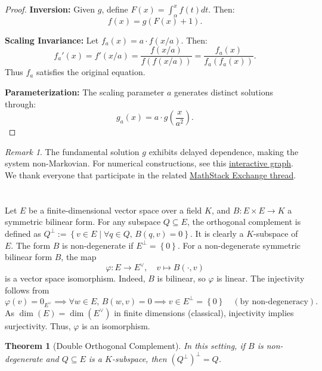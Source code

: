\documentclass[11pt, a4paper, oneside]{article}
\newtheorem{theorem}{Theorem}
\theoremstyle{remark}
\newtheorem*{remark}{Remark}
\theoremstyle{lemma}
\begin{document}
\begin{proof}
\textbf{Inversion:} Given \( g \), define \( F(x) = \int_{\alpha}^x f(t)dt \). Then:
\[
f(x) = g(F(x) + 1).
\]

\textbf{Scaling Invariance:} Let \( f_a(x) = a \cdot f(x/a) \). Then:
\[
f_a'(x) = f'(x/a) = \frac{f(x/a)}{f(f(x/a))} = \frac{f_a(x)}{f_a(f_a(x))}.
\]
Thus \( f_a \) satisfies the original equation.

\textbf{Parameterization:} The scaling parameter \( a \) generates distinct solutions through:
\[
g_a(x) = a \cdot g\left(\frac{x}{a^2}\right).
\]
\end{proof}
\begin{remark}
The fundamental solution \( g \) exhibits delayed dependence, making the system non-Markovian. For numerical constructions, see this \href{https://www.desmos.com/calculator/hfizeaaf9k}{interactive graph}. We thank everyone that participate in the related \href{https://math.stackexchange.com/questions/5051989/solve-the-differential-equation-f-f-f-circ-f}{MathStack Exchange thread}.
\end{remark}
\newpage
\appendix
\section{}
\label{A}
Let \( E \) be a finite-dimensional vector space over a field \( K \), and \( B: E \times E \to K \) a symmetric bilinear form. For any subspace \( Q \subseteq E \), the orthogonal complement is defined as \( Q^\perp := \left\{ v \in E \mid \forall q \in Q, \, B\left(q, v\right) = 0 \right\} \). It is clearly a \( K \)-subspace of \( E \). The form \( B \) is non-degenerate if \( E^\perp = \left\{0\right\} \). For a non-degenerate symmetric bilinear form \( B \), the map
\[
\varphi: E \to E^{\vee}, \quad v \mapsto B\left(\cdot, v\right)
\]
is a vector space isomorphism. Indeed, \( B \) is bilinear, so \( \varphi \) is linear. The injectivity follows from
\[
\varphi\left(v\right) = 0_{E^{\vee}} \implies \forall w \in E, \, B\left(w, v\right) = 0 \implies v \in E^\perp = \left\{0\right\} \quad \left(\text{by non-degeneracy}\right).
\]
As \( \dim\left(E\right) = \dim\left(E^{\vee}\right) \) in finite dimensions (classical), injectivity implies surjectivity. Thus, \( \varphi \) is an isomorphism.

\begin{theorem}[Double Orthogonal Complement]
    In this setting, if \( B \) is non-degenerate and \( Q \subseteq E \) is a \( K \)-subspace, then \( \left(Q^{\perp}\right)^{\perp} = Q \).
\end{theorem}
\end{document}
